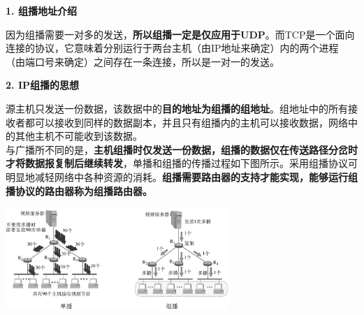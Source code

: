 \textbf{{1. 组播地址介绍}}

因为组播需要一对多的发送，{\textbf{所以组播一定是仅应用于UDP}}。而TCP是一个面向连接的协议，它意味着分别运行于两台主机（由IP地址来确定）内的两个进程（由端口号来确定）之间存在一条连接，所以是一对一的发送。

{\textbf{2. IP组播的思想}}

源主机只发送一份数据，该数据中的{\textbf{目的地址为组播的组地址}}。组地址中的所有接收者都可以接收到同样的数据副本，并且只有组播内的主机可以接收数据，网络中的其他主机不可能收到该数据。\\

与广播所不同的是，\textbf{主机组播时仅发送一份数据，组播的数据仅在传送路径分岔时才将数据报复制后继续转发}，单播和组播的传播过程如下图所示。采用组播协议可明显地减轻网络中各种资源的消耗。\textbf{{组播需要路由器的支持才能实现，能够运行组播协议的路由器称为组播路由器}。}

\textbf{\includegraphics[width=3.33333in,height=1.52083in]{png-jpeg-pics/22E028E75BD2B29A8C79154A3C22AAB7.png}\\
}
